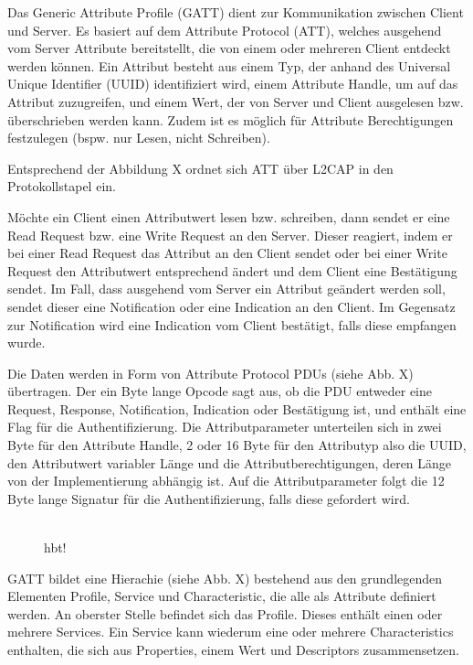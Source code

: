 Das Generic Attribute Profile (GATT) dient zur Kommunikation zwischen Client und Server. Es basiert auf dem Attribute Protocol (ATT), welches ausgehend vom Server Attribute bereitstellt, die von einem oder mehreren Client entdeckt werden können. Ein Attribut besteht aus einem Typ, der anhand des Universal Unique Identifier (UUID) identifiziert wird, einem Attribute Handle, um auf das Attribut zuzugreifen, und einem Wert, der von Server und Client ausgelesen bzw. überschrieben werden kann. Zudem ist es möglich für Attribute Berechtigungen festzulegen (bspw. nur Lesen, nicht Schreiben). \cite{BtSpec4.0_1835}

Entsprechend der Abbildung X ordnet sich ATT über L2CAP in den Protokollstapel ein.

Möchte ein Client einen Attributwert lesen bzw. schreiben, dann sendet er eine Read Request bzw. eine Write Request an den Server. Dieser reagiert, indem er bei einer Read Request das Attribut an den Client sendet oder bei einer Write Request den Attributwert entsprechend ändert und dem Client eine Bestätigung sendet. Im Fall, dass ausgehend vom Server ein Attribut geändert werden soll, sendet dieser eine Notification oder eine Indication an den Client. Im Gegensatz zur Notification wird eine Indication vom Client bestätigt, falls diese empfangen wurde. \cite{BtSpec4.0_1854-1855} \cite{BtSpec4.0_1861-1863}

Die Daten werden in Form von Attribute Protocol PDUs (siehe Abb. X) übertragen.
Der ein Byte lange Opcode sagt aus, ob die PDU entweder eine Request, Response, Notification, Indication oder Bestätigung ist, und enthält eine Flag für die Authentifizierung. Die Attributparameter unterteilen sich in zwei Byte für den Attribute Handle, 2 oder 16 Byte für den Attributyp also die UUID, den Attributwert variabler Länge und die Attributberechtigungen, deren Länge von der Implementierung abhängig ist. Auf die Attributparameter folgt die 12 Byte lange Signatur für die Authentifizierung, falls diese gefordert wird. \cite{BtSpec4.0_1888-1889}
\\\\
\begin{figure}{hbt!}
    \caption[]{\cite{BtSpec4.0_1892}}
\end{figure}
GATT bildet eine Hierachie (siehe Abb. X) bestehend aus den grundlegenden Elementen Profile, Service und Characteristic, die alle als Attribute definiert werden. An oberster Stelle befindet sich das Profile. Dieses enthält einen oder mehrere Services. Ein Service kann wiederum eine oder mehrere Characteristics enthalten, die sich aus Properties, einem Wert und Descriptors zusammensetzen.